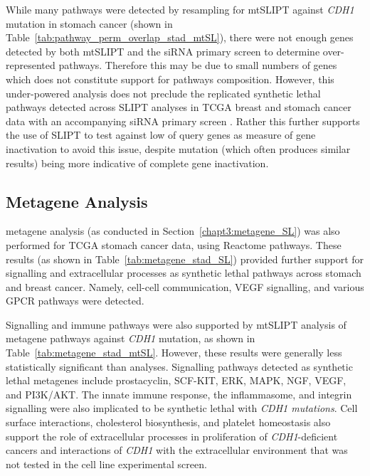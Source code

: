 While many \glspl{pathway} were detected by resampling for \acrshort{mtSLIPT} against \textit{CDH1} \gls{mutation} in stomach cancer (shown in Table~\ref{tab:pathway_perm_overlap_stad_mtSL}), there were not enough genes detected by both \acrshort{mtSLIPT} and the \gls{siRNA} primary screen to determine over-represented \glspl{pathway}. Therefore this may be due to small numbers of genes which does not constitute support for \glspl{pathway} composition. However, this under-powered analysis does not preclude the replicated \gls{synthetic lethal} \glspl{pathway} detected across \gls{SLIPT}  analyses in \gls{TCGA} breast and stomach cancer data with an accompanying \gls{siRNA} primary screen \citep{Telford2015}. Rather this further supports the use of \gls{SLIPT} to test against low  of query genes as measure of gene inactivation to avoid this issue, despite \gls{mutation} (which often produces similar results) being more indicative of complete gene inactivation.

\FloatBarrier

\subsection{Metagene Analysis} \label{chapt3:metagene_stad_SL}

\Gls{metagene} analysis (as conducted in Section~\ref{chapt3:metagene_SL}) was also performed for \gls{TCGA} stomach cancer  data, using Reactome \glspl{pathway}. These results (as shown in Table~\ref{tab:metagene_stad_SL}) provided further support for signalling and extracellular processes as \gls{synthetic lethal} \glspl{pathway} across stomach and breast cancer. Namely, cell-cell communication, VEGF signalling, and various \gls{GPCR} \glspl{pathway} were detected.  

Signalling and immune \glspl{pathway} were also supported by \acrshort{mtSLIPT} analysis of \gls{metagene} \glspl{pathway}  against \textit{CDH1} \gls{mutation}, as shown in Table~\ref{tab:metagene_stad_mtSL}. However, these results were generally less statistically significant than  analyses. Signalling \glspl{pathway} detected as \gls{synthetic lethal} \glspl{metagene} include prostacyclin, SCF-KIT, ERK, MAPK, NGF, VEGF, and PI3K/AKT. The innate immune response, the inflammasome, and integrin signalling were also implicated to be \gls{synthetic lethal} with \textit{CDH1 \glspl{mutation}}. Cell surface interactions, cholesterol biosynthesis, and platelet homeostasis also support the role of extracellular processes in proliferation of \textit{CDH1}-deficient cancers and interactions of \textit{CDH1} with the extracellular environment that was not tested in the cell line experimental screen.

